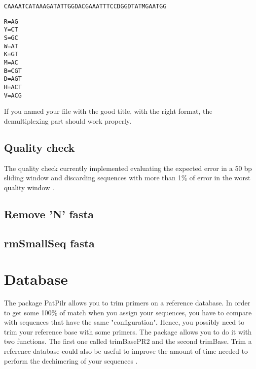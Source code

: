 \documentclass{article}\usepackage[]{graphicx}\usepackage[]{color}
\makeatletter
\newcommand{\hlstd}[1]{\textcolor[rgb]{0.345,0.345,0.345}{#1}}%
\newcommand{\hlkwb}[1]{\textcolor[rgb]{0.69,0.353,0.396}{#1}}%
\newenvironment{kframe}{%
 \def\at@end@of@kframe{}%
 \ifinner\ifhmode%
  \def\at@end@of@kframe{\end{minipage}}%
  \begin{minipage}{\columnwidth}%
 \fi\fi%
 \def\FrameCommand##1{\hskip\@totalleftmargin \hskip-\fboxsep
 \colorbox{shadecolor}{##1}\hskip-\fboxsep
     \hskip-\linewidth \hskip-\@totalleftmargin \hskip\columnwidth}%
 \MakeFramed {\advance\hsize-\width
   \@totalleftmargin\z@ \linewidth\hsize
   \@setminipage}}%
 {\par\unskip\endMakeFramed%
 \at@end@of@kframe}
\newenvironment{knitrout}{}{} %
\makeatother
\begin{document}
\begin{knitrout}
\color{fgcolor}\begin{kframe}
\begin{alltt}
CAAAATCATAAAGATATTGGDAC	GAAATTTCCDGGDTATMGAATGG
\end{alltt}
\end{kframe}
\end{knitrout}

\begin{knitrout}
\color{fgcolor}\begin{kframe}
\begin{alltt}
\hlstd{R} \hlkwb{=} \hlstd{AG}
\hlstd{Y} \hlkwb{=} \hlstd{CT}
\hlstd{S} \hlkwb{=} \hlstd{GC}
\hlstd{W} \hlkwb{=} \hlstd{AT}
\hlstd{K} \hlkwb{=} \hlstd{GT}
\hlstd{M} \hlkwb{=} \hlstd{AC}
\hlstd{B} \hlkwb{=} \hlstd{CGT}
\hlstd{D} \hlkwb{=} \hlstd{AGT}
\hlstd{H} \hlkwb{=} \hlstd{ACT}
\hlstd{V} \hlkwb{=} \hlstd{ACG}
\end{alltt}
\end{kframe}
\end{knitrout}

If you named your file with the good title, with the right format, the demultiplexing part should work properly.

\subsection{Quality check}
\label{subsec:qualcheck}

The quality check currently implemented evaluating the expected error in a 50 bp sliding window and discarding sequences with more than 1\% of error in the worst quality window \cite{DeVargas2015}.

\subsection{Remove 'N' fasta}

\subsection{rmSmallSeq fasta}


\section{Database}
The package PatPilr allows you to trim primers on a reference database. In order to get some 100\% of match when you assign your sequences, you have to compare with sequences that have the same "configuration". Hence, you possibly need to trim your reference base with some primers. The package allows you to do it with two functions. The first one called trimBasePR2 \cite{doi:10.1093/nar/gks1160} and the second trimBase. Trim a reference database could also be useful to improve the amount of time needed to perform the dechimering of your sequences \cite{Edgar074252}.
\end{document}
